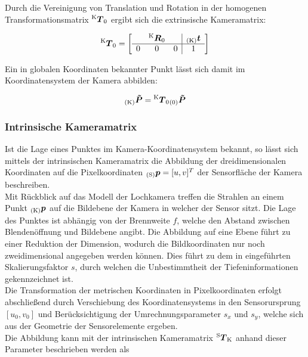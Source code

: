 Durch die Vereinigung von Translation und Rotation in der homogenen Transformationsmatrix $\tmat{K}{0}$ ergibt sich die extrinsische Kameramatrix:

\begin{equation}
\tmat{K}{0} = 
\mat{ccc|c}{
  & \rmat{K}{0} &   & \ve{K}{t} \\
\hline
0 &      0      & 0 & 1 \\
}
\end{equation}

Ein in globalen Koordinaten bekannter Punkt lässt sich damit im Koordinatensystem der Kamera abbilden:

\begin{equation}
\ve{K}{\tilde{P}} = \tmat{K}{0}\ve{0}{\tilde{P}}
\end{equation}


\subsubsection{Intrinsische Kameramatrix}
Ist die Lage eines Punktes im Kamera-Koordinatensystem bekannt, so lässt sich mittels der intrinsischen Kameramatrix die Abbildung der dreidimensionalen Koordinaten auf die Pixelkoordinaten $\ve{S}{p} = [u,v]^T$ der Sensorfläche der Kamera beschreiben.\\
Mit Rückblick auf das Modell der Lochkamera treffen die Strahlen an einem Punkt $\ve{K}{{p}}$ auf die Bildebene der Kamera in welcher der Sensor sitzt. Die Lage des Punktes ist abhängig von der Brennweite $f$, welche den Abstand zwischen Blendenöffnung und Bildebene angibt. Die Abbildung auf eine Ebene führt zu einer Reduktion der Dimension, wodurch die Bildkoordinaten nur noch zweidimensional angegeben werden können. Dies führt zu dem in  eingeführten Skalierungsfaktor $s$, durch welchen die Unbestimmtheit der Tiefeninformationen gekennzeichnet ist.\\
Die Transformation der metrischen Koordinaten in Pixelkoordinaten erfolgt abschließend durch Verschiebung des Koordinatensystems in den Sensorursprung $[u_0,v_0]$ und Berücksichtigung der Umrechnungsparameter $s_x$ und $s_y$, welche sich aus der Geometrie der Sensorelemente ergeben. \\
Die Abbildung kann mit der intrinsischen Kameramatrix $\tmat{S}{K}$ anhand dieser Parameter beschrieben werden als

